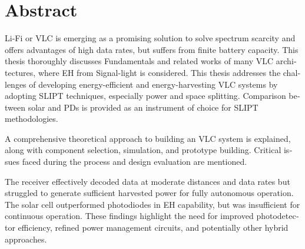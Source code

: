 \section*{Abstract}
\begin{otherlanguage}{english}
\ac{Li-Fi} or \ac{VLC} is emerging as a promising solution to solve spectrum scarcity and offers advantages of high data rates, but suffers from finite battery capacity. This thesis thoroughly discusses Fundamentals and related works of many \ac{VLC} architectures, where \ac{EH} from Signal-light is considered. This thesis addresses the challenges of developing energy-efficient and energy-harvesting \ac{VLC} systems by adopting \ac{SLIPT} techniques, especially power and space splitting. Comparison between solar and \ac{PD}s is provided as an instrument of choice for \ac{SLIPT} methodologies. 

A comprehensive theoretical approach to building an \ac{VLC} system is explained, along with component selection, simulation, and prototype building. Critical issues faced during the process and design evaluation are mentioned.

The receiver effectively decoded data at moderate distances and data rates but struggled to generate sufficient harvested power for fully autonomous operation. The solar cell outperformed photodiodes in \ac{EH} capability, but was insufficient for continuous operation. These findings highlight the need for improved photodetector efficiency, refined power management circuits, and potentially other hybrid approaches.
\end{otherlanguage}
\vfill

